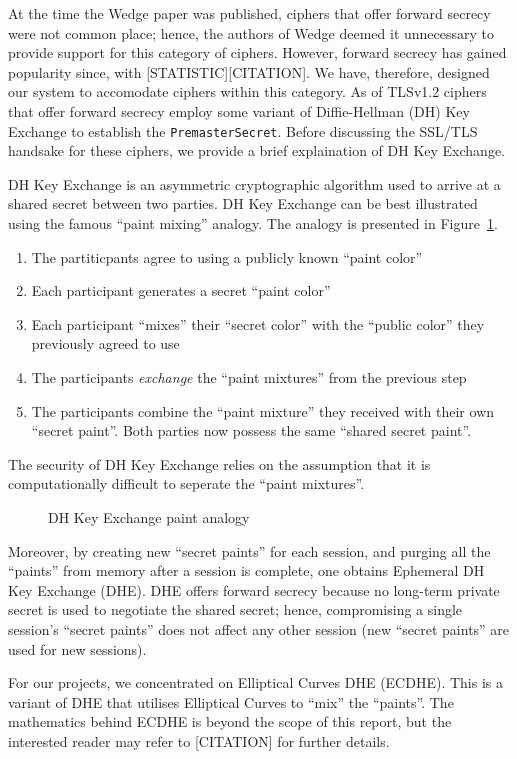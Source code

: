 \documentclass[../../main.tex]{subfiles}
\begin{document}
At the time the Wedge paper was published, ciphers that offer forward
secrecy were not common place; hence, the authors of Wedge deemed it
unnecessary to provide support for this category of ciphers. However,
forward secrecy has gained popularity since, with
[STATISTIC][CITATION]. We have, therefore, designed our system to
accomodate ciphers within this category. As of TLSv1.2 ciphers that
offer forward secrecy employ some variant of Diffie-Hellman (DH) Key
Exchange to establish the \texttt{PremasterSecret}. Before discussing
the SSL/TLS handsake for these ciphers, we provide a brief
explaination of DH Key Exchange.


DH Key Exchange is an asymmetric cryptographic algorithm used to
arrive at a shared secret between two parties. DH Key Exchange can be
best illustrated using the famous ``paint mixing'' analogy. The
analogy is presented in Figure~\ref{fig:paint}.
\begin{enumerate}
  \item The partiticpants agree to using a publicly known ``paint
    color''
  \item Each participant generates a secret ``paint color''
  \item Each participant ``mixes'' their ``secret color'' with the
    ``public color'' they previously agreed to use
  \item The participants \textit{exchange} the ``paint mixtures'' from
    the previous step
  \item The participants combine the ``paint mixture'' they received
    with their own ``secret paint''. Both parties now possess the same
    ``shared secret paint''.
\end{enumerate}
The security of DH Key Exchange relies on the assumption that it is
computationally difficult to seperate the ``paint mixtures''.
\begin{figure}[H]
  \centering
  
  \caption{DH Key Exchange paint analogy}
  \label{fig:paint}
\end{figure}
Moreover, by creating new ``secret paints'' for each session, and
purging all the ``paints'' from memory after a session is complete,
one obtains Ephemeral DH Key Exchange (DHE). DHE offers forward
secrecy because no long-term private secret is used to negotiate the
shared secret; hence, compromising a single session's ``secret
paints'' does not affect any other session (new ``secret paints'' are
used for new sessions).

For our projects, we concentrated on Elliptical Curves DHE (ECDHE).
This is a variant of DHE that utilises Elliptical Curves to ``mix''
the ``paints''. The mathematics behind ECDHE is beyond the scope of
this report, but the interested reader may refer to [CITATION] for
further details.
\end{document}
